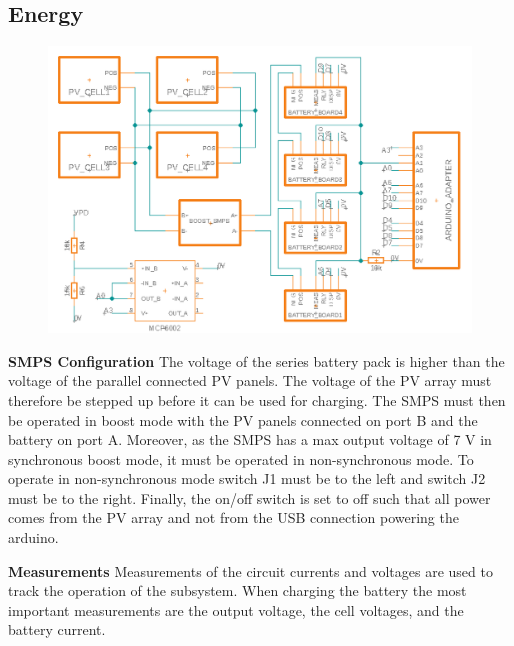 \documentclass[a4paper]{article}
\begin{document}
\subsection{Energy}
\begin{figure}[H]
    \centering
    \includegraphics[width=\textwidth]{Circuit_Diagram.png}
    \label{fig:circuitDiagram}
\end{figure}

\textbf{SMPS Configuration}
\vspace{10pt} 
\newline
The voltage of the series battery pack is higher than the voltage of the parallel connected
PV panels. The voltage of the PV array must therefore be stepped up before it can be used
for charging. The SMPS must then be operated in boost mode with the
PV panels connected on port B and the battery on port A. Moreover, as the 
SMPS has a max output voltage of 7 V in synchronous boost mode\cite{powerLogbook}, 
it must be operated in non-synchronous mode. To operate in non-synchronous mode switch J1
must be to the left and switch J2 must be to the right. Finally, the on/off switch is 
set to off such that all power comes from the PV array and not from the USB connection 
powering the arduino.

\textbf{Measurements}
\vspace{10pt} 
\newline
Measurements of the circuit currents and voltages are used to track the operation of the
subsystem. When charging the battery the most important measurements are the output voltage,
the cell voltages, and the battery current.
\end{document}
